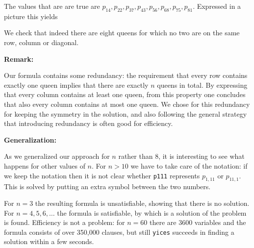\documentclass[12pt]{article}
\begin{document}
The values that are are true are $p_{14}, p_{22}, p_{37}, p_{43},
p_{56}, p_{68}, p_{75}, p_{81}$. Expressed in a picture this
yields

\vspace{3mm}



\vspace{3mm}

We check that indeed there are eight queens for which no two are
on the same row, column or diagonal.

\vspace{3mm}

{\bf Remark:} 

Our formula contains some redundancy: the requirement that every
row contains exactly one queen implies that there are exactly $n$
queens in total. By expressing that every column contains at least
one queen, from this property one concludes that also every column
contains at most one queen. We chose for this redundancy for
keeping the symmetry in the solution, and also following the
general strategy that introducing redundancy is often good for
efficiency.

\vspace{3mm}

{\bf Generalization:} 

As we generalized our approach for $n$ rather than 8, it is
interesting to see what happens for other values of $n$. For $n
> 10$ we have to take care of the notation: if we keep the
notation then it is not clear whether {\tt p111} represents 
$p_{1,11}$ or $p_{11,1}$. This is solved by putting an extra 
symbol between the two numbers. 

For $n=3$ the resulting formula is unsatisfiable, showing that
there is no solution. For $n = 4,5,6,\ldots$ the formula is
satisfiable, by which is a solution of the problem is found.
Efficiency is not a problem: for $n = 60$ there are 3600
variables and the formula consists of over 350,000 clauses, but 
still {\tt yices} succeeds in finding a solution within a few
seconds.
\end{document}
